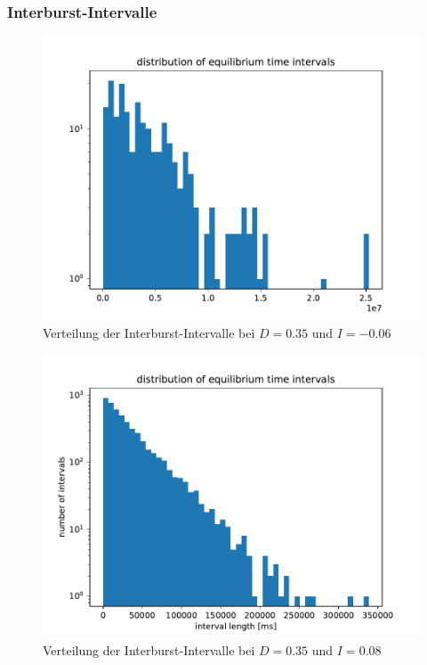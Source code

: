 \documentclass[12pt,a4paper]{article}
\begin{document}
\subsubsection{Interburst-Intervalle}
\begin{figure}[H]
	\centering
	\includegraphics[scale=0.5]{eqdistajrj2newrealfast11jjem2sh352.pdf}\caption{Verteilung der Interburst-Intervalle bei $D=0.35$ und $I=-0.06$}
	\label{hist35bad}
\end{figure}
\begin{figure}[H]
	\centering
	\includegraphics[scale=0.5]{eqdistajrj2newrealfast11jjem2sh359.pdf}\caption{Verteilung der Interburst-Intervalle bei $D=0.35$ und $I=0.08$}
	\label{hist35}
\end{figure}
\end{document}
